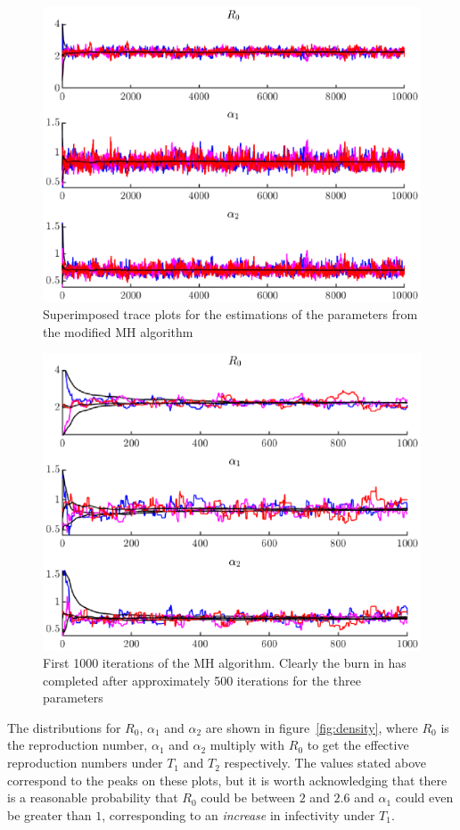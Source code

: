 \documentclass{X:/Documents/Coding/Latex/myassignment}
\begin{document}
\clearpage
\begin{figure}[tb]
	\centering
	\includegraphics[width=0.8\linewidth]{MHplot0.eps}
	\caption{Superimposed trace plots for the estimations of the parameters from the modified MH algorithm}
	\label{fig:fullrun}
\end{figure}
\begin{figure}[tbh]
	\centering
	\includegraphics[width=0.8\linewidth]{MHplot1.eps}
	\caption{First 1000 iterations of the MH algorithm. Clearly the burn in has completed after approximately 500 iterations for the three parameters }
	\label{fig:burnin}
\end{figure}


\clearpage

The distributions for $R_0$, $\alpha_1$ and $\alpha_2$ are shown in figure~\ref{fig:density}, where $R_0$ is the reproduction number, $\alpha_1$ and $\alpha_2$ multiply with $R_0$ to get the effective reproduction numbers under $T_1$ and $T_2$ respectively. 
The values stated above correspond to the peaks on these plots, but it is worth acknowledging that there is a reasonable probability that $R_0$ could be between $2$ and $2.6$ and $\alpha_1$ could even be greater than $1$, corresponding to an \textit{increase} in infectivity under $T_1$.
\end{document}
